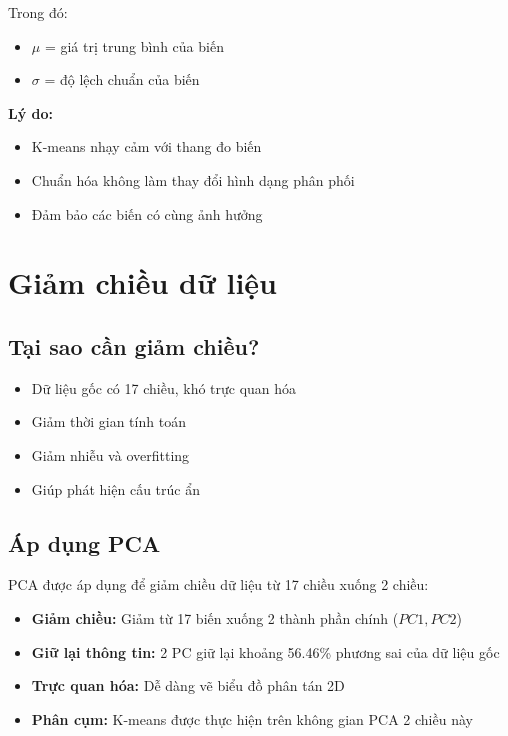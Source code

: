 Trong đó:
\begin{itemize}
    \item $\mu$ = giá trị trung bình của biến
    \item $\sigma$ = độ lệch chuẩn của biến
\end{itemize}

\textbf{Lý do:}
\begin{itemize}
    \item K-means nhạy cảm với thang đo biến
    \item Chuẩn hóa không làm thay đổi hình dạng phân phối
    \item Đảm bảo các biến có cùng ảnh hưởng
\end{itemize}

\section{Giảm chiều dữ liệu}

\subsection{Tại sao cần giảm chiều?}

\begin{itemize}
    \item Dữ liệu gốc có 17 chiều, khó trực quan hóa
    \item Giảm thời gian tính toán
    \item Giảm nhiễu và overfitting
    \item Giúp phát hiện cấu trúc ẩn
\end{itemize}

\subsection{Áp dụng PCA}

PCA được áp dụng để giảm chiều dữ liệu từ 17 chiều xuống 2 chiều:
\begin{itemize}
    \item \textbf{Giảm chiều:} Giảm từ 17 biến xuống 2 thành phần chính ($PC1, PC2$)
    \item \textbf{Giữ lại thông tin:} 2 PC giữ lại khoảng 56.46\% phương sai của dữ liệu gốc
    \item \textbf{Trực quan hóa:} Dễ dàng vẽ biểu đồ phân tán 2D
    \item \textbf{Phân cụm:} K-means được thực hiện trên không gian PCA 2 chiều này
\end{itemize}

